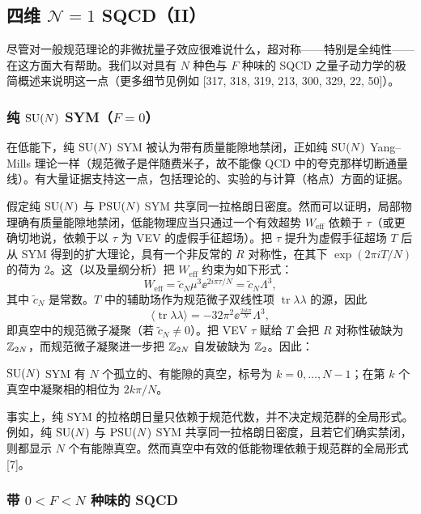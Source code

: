 \subsection{四维 $\mathcal{N}=1$ SQCD（II）}

尽管对一般规范理论的非微扰量子效应很难说什么，超对称——特别是全纯性——在这方面大有帮助。我们以对具有 $N$ 种色与 $F$ 种味的 SQCD 之量子动力学的极简概述来说明这一点（更多细节见例如 [317, 318, 319, 213, 300, 329, 22, 50]）。

\subsubsection*{纯 $\operatorname{SU}(N)$ SYM（$F=0$）}

在低能下，纯 $\operatorname{SU}(N)$ SYM 被认为带有质量能隙地禁闭，正如纯 $\operatorname{SU}(N)$ Yang--Mills 理论一样（规范微子是伴随费米子，故不能像 QCD 中的夸克那样切断通量线）。有大量证据支持这一点，包括理论的、实验的与计算（格点）方面的证据。

假定纯 $\operatorname{SU}(N)$ 与 $\operatorname{PSU}(N)$ SYM 共享同一拉格朗日密度。然而可以证明，局部物理确有质量能隙地禁闭，低能物理应当只通过一个有效超势 $W_{\mathrm{eff}}$ 依赖于 $\tau$（或更确切地说，依赖于以 $\tau$ 为 VEV 的虚假手征超场）。把 $\tau$ 提升为虚假手征超场 $T$ 后从 SYM 得到的扩大理论，具有一个非反常的 $R$ 对称性，在其下 $\exp(2\pi iT/N)$ 的荷为 $2$。这（以及量纲分析）把 $W_{\mathrm{eff}}$ 约束为如下形式：
\[
W_{\mathrm{eff}}=\tilde c_N\mu^3\ee^{2i\pi\tau/N}=\tilde c_N\Lambda^3,
\]
其中 $\tilde c_N$ 是常数。$T$ 中的辅助场作为规范微子双线性项 $\operatorname{tr}\lambda\lambda$ 的源，因此
\[
\langle\operatorname{tr}\lambda\lambda\rangle=-32\pi^2\ee^{\frac{2ik\pi}{N}}\Lambda^3,
\]
即真空中的规范微子凝聚（若 $\tilde c_N\ne0$）。把 VEV $\tau$ 赋给 $T$ 会把 $R$ 对称性破缺为 $\mathbb{Z}_{2N}$，而规范微子凝聚进一步把 $\mathbb{Z}_{2N}$ 自发破缺为 $\mathbb{Z}_2$。因此：

\begin{proposition}[17.46]
$\operatorname{SU}(N)$ SYM 有 $N$ 个孤立的、有能隙的真空，标号为 $k=0,\dots,N-1$；在第 $k$ 个真空中凝聚相的相位为 $2k\pi/N$。
\end{proposition}

\begin{remark}[17.47]
事实上，纯 SYM 的拉格朗日量只依赖于规范代数，并不决定规范群的全局形式。例如，纯 $\operatorname{SU}(N)$ 与 $\operatorname{PSU}(N)$ SYM 共享同一拉格朗日密度，且若它们确实禁闭，则都显示 $N$ 个有能隙真空。然而真空中有效的低能物理依赖于规范群的全局形式 [7]。
\end{remark}

\subsubsection*{带 $0<F<N$ 种味的 SQCD}

